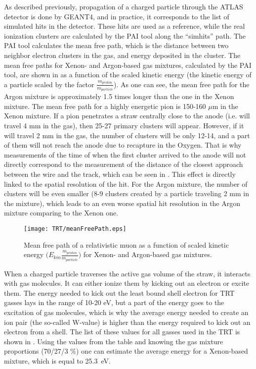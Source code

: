 As described previously, propagation of a charged particle through the ATLAS detector is done by GEANT4, and in practice, it corresponds to the list of simulated hits in the detector.
These hits are used as a reference, while the real ionization clusters are calculated by the PAI tool along the ``simhits'' path.
The PAI tool calculates the mean free path, which is the distance between two neighbor electron clusters in the gas, and energy deposited in the cluster. 
The mean free paths for Xenon- and Argon-based gas mixtures, calculated by the PAI tool, are shown in  as a function of the scaled kinetic energy 
(the kinetic energy of a particle scaled by the factor $\frac{m_{proton}}{m_{particle}}$). As one can see, the mean free path for the Argon mixture is approximately 1.5 times longer than the one in the Xenon mixture.
The mean free path for a highly energetic pion is 150-160 $\mu$m in the Xenon mixture. If a pion penetrates a straw centrally close to the anode (i.e. will travel 4 mm in the gas), then 25-27 primary clusters will appear.
However, if it will travel 2 mm in the gas, the number of clusters will be only 12-14, and a part of them will not reach the anode due to recapture in the Oxygen. 
That is why measurements of the time of when the first cluster arrived to the anode will not directly correspond to the measurement of the distance of the closest approach between the wire and the track, 
which can be seen in . This effect is directly linked to the spatial resolution of the hit.
For the Argon mixture, the number of clusters will be even smaller (8-9 clusters created by a particle traveling 2 mm in the mixture), which leads to an even worse spatial hit resolution in the Argon mixture comparing 
to the Xenon one.

\begin{figure}[h]
\centering
 \texttt{[image: TRT/meanFreePath.eps]}
\caption{Mean free path of a relativistic muon as a function of scaled kinetic energy $\big(E_{kin}\frac{m_{proton}}{m_{particle}}\big)$ for Xenon- and Argon-based gas mixtures.}
\label{fig:meanFreePath}
\end{figure}

When a charged particle traverses the active gas volume of the straw, it interacts with gas molecules.
It can either ionize them by kicking out an electron or excite them. The energy needed to kick out the least bound shell electron for TRT gasses lays
in the range of 10-20 eV, but a part of the energy goes to the excitation of gas molecules, which is why the average energy needed to create an ion pair (the so-called W-value) is higher than the energy required to kick out an electron from a shell. The list of these values for all gasses used in the TRT is shown in .
Using the values from the table and knowing the gas mixture proportions (70/27/3 $\%$) one can estimate the average energy for a Xenon-based mixture, which is equal to 25.3~eV.


